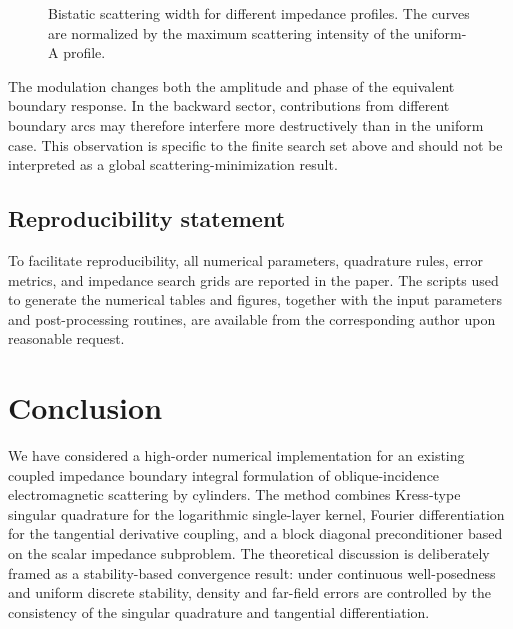 \documentclass[11pt]{article}
\numberwithin{equation}{section}
\begin{document}
\begin{figure}[htbp]
\centering
{}
\caption{Bistatic scattering width for different impedance profiles. The curves are normalized by the maximum scattering intensity of the uniform-A profile.}
\label{fig:width}
\end{figure}

The modulation changes both the amplitude and phase of the equivalent boundary response. In the backward sector, contributions from different boundary arcs may therefore interfere more destructively than in the uniform case. This observation is specific to the finite search set above and should not be interpreted as a global scattering-minimization result.

\subsection*{Reproducibility statement}

To facilitate reproducibility, all numerical parameters, quadrature rules, error metrics, and impedance search grids are reported in the paper. The scripts used to generate the numerical tables and figures, together with the input parameters and post-processing routines, are available from the corresponding author upon reasonable request.

\section{Conclusion}

We have considered a high-order numerical implementation for an existing coupled impedance boundary integral formulation of oblique-incidence electromagnetic scattering by cylinders. The method combines Kress-type singular quadrature for the logarithmic single-layer kernel, Fourier differentiation for the tangential derivative coupling, and a block diagonal preconditioner based on the scalar impedance subproblem. The theoretical discussion is deliberately framed as a stability-based convergence result: under continuous well-posedness and uniform discrete stability, density and far-field errors are controlled by the consistency of the singular quadrature and tangential differentiation.
\end{document}

